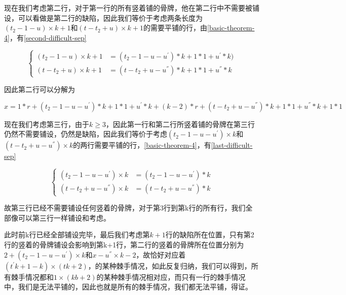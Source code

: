 现在我们考虑第二行，对于第一行的所有竖着铺的骨牌，他在第二行中不需要被铺设，可以看做是第二行的缺陷，因此我们等价于考虑两条长度为$(t_2 - 1 - u) \times k + 1$和$(t - t_2 + u) \times k + 1$的需要平铺的行，由\ref*{basic-theorem-4}，有\ref*{second-difficult-sep}

$$
    \left\{
    \begin{aligned}
        (t_2- 1 - u) \times k + 1  & = (t_2- 1 - u - u^{'}) * k + 1* 1 +  u^{'} * k)    \\
        (t - t_2 + u) \times k + 1 & = (t - t_2 + u - u^{''}) * k + 1 * 1 +  u^{''} * k
        \label{second-difficult-sep}
    \end{aligned}
    \right.
$$

因此第二行可以分解为

$x =  1 * r +  (t_2- 1 - u - u^{'}) * k + 1 * 1 +  u^{'} * k  + (k - 2) * r + (t - t_2 + u - u^{''}) * k + 1 * 1 +  u^{''} * k + 1 * 1$

现在我们考虑第三行，由于$k \ge 3$，因此第一行和第二行所竖着铺的骨牌在第三行仍然不需要铺设，仍然是缺陷，因此我们等价于考虑$(t_2- 1 - u - u^{'}) \times k$和$(t - t_2 + u - u^{''}) \times k$的两行需要平铺的行，\ref*{basic-theorem-4}，有\ref*{last-difficult-sep}

$$
    \left\{
    \begin{aligned}
        (t_2- 1 - u - u^{'}) \times k   & = (t_2- 1 - u - u^{'}) * k   \\
        (t - t_2 + u - u^{''}) \times k & = (t - t_2 + u - u^{''}) * k
        \label{last-difficult-sep}
    \end{aligned}
    \right.
$$

故第三行已经不需要铺设任何竖着的骨牌，对于第3行到第k行的所有行，我们全部像可以第三行一样铺设和考虑。

此时前k行已经全部铺设完毕，最后我们考虑第$k + 1$行的缺陷所在位置，只有第2行的竖着的骨牌铺设会影响到第k+1行，第二行的竖着的骨牌所在位置分别为$2 + (t_2- 1 - u - u^{'}) \times k$和$x - u^{''} \times k - 2$，故恰好对应着$(t^{'}k + 1 - k) \times (tk + 2)$，的某种棘手情况，如此反复归纳，我们可以得到，所有棘手情况都和$1 \times (kb + 2)$的某种棘手情况相对应，而只有一行的棘手情况中，我们是无法平铺的，因此也就是所有的棘手情况，我们都无法平铺，得证。

\clearpage